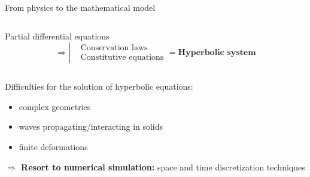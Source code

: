 \begin{frame}{From physics to the mathematical model}
\begin{overprint}
\begin{columns}
      \begin{column}{0.55\textwidth}
        \begin{block}{Partial differential equations}
          \begin{equation*}
            \Rightarrow \left\lvert
              \begin{aligned}
                & \text{Conservation laws} \\
                & \text{Constitutive equations} 
              \end{aligned}
            \right. = \textbf{Hyperbolic system}
          \end{equation*}
        \end{block}
      \end{column}
    \end{columns}
    
    \begin{block}{Difficulties for the solution of hyperbolic equations:}
      \begin{itemize}
      \item complex geometries
      \item waves propagating/interacting in solids \cite{Wang}
      \item finite deformations
      \end{itemize}
    \end{block}
    \textbf{$\Rightarrow$ Resort to numerical simulation:} space and time discretization techniques
  \end{overprint}
  
\end{frame}


